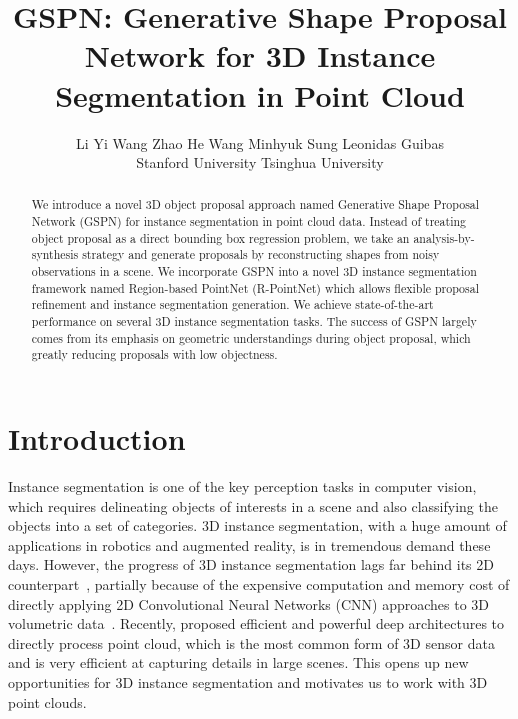\documentclass[10pt,twocolumn,letterpaper]{article}
\begin{document}
\title{GSPN: Generative Shape Proposal Network for 3D Instance Segmentation in Point Cloud}


\author{Li Yi \qquad Wang Zhao \qquad He Wang \qquad Minhyuk Sung  \qquad Leonidas Guibas\\Stanford University \qquad Tsinghua University}



\maketitle
\setlength\abovedisplayskip{5pt}
\setlength\belowdisplayskip{5pt}

\begin{abstract}
We introduce a novel 3D object proposal approach named Generative Shape Proposal Network (GSPN) for instance segmentation in point cloud data. Instead of treating object proposal as a direct bounding box regression problem, we take an analysis-by-synthesis strategy and generate proposals by reconstructing shapes from noisy observations in a scene. We incorporate GSPN into a novel 3D instance segmentation framework named Region-based PointNet (R-PointNet) which allows flexible proposal refinement and instance segmentation generation. We achieve state-of-the-art performance on several 3D instance segmentation tasks. The success of GSPN largely comes from its emphasis on geometric understandings during object proposal, which greatly reducing proposals with low objectness.
\end{abstract}
\vspace{-\baselineskip}

\section{Introduction}
\noindent Instance segmentation is one of the key perception tasks in computer vision, which requires delineating objects of interests in a scene and also classifying the objects into a set of categories. 3D instance segmentation, with a huge amount of applications in robotics and augmented reality, is in tremendous demand these days. However, the progress of 3D instance segmentation lags far behind its 2D counterpart~\cite{he2017mask, liu2018path, li2016fully}, partially because of the expensive computation and memory cost of directly applying 2D Convolutional Neural Networks (CNN) approaches to 3D volumetric data~\cite{song2016deep, deng2017amodal}. Recently, \cite{qi2017pointnet, qi2017pointnet++} proposed efficient and powerful deep architectures to directly process point cloud, which is the most common form of 3D sensor data and is very efficient at capturing details in large scenes. This opens up new opportunities for 3D instance segmentation and motivates us to work with 3D point clouds.
\end{document}
